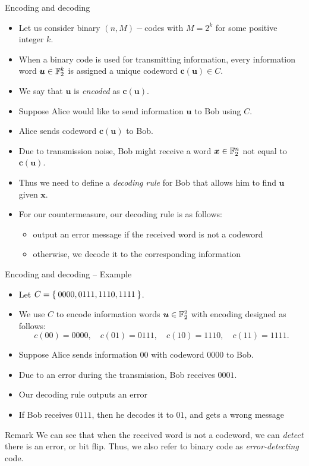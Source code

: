 \begin{frame}{Encoding and decoding}
    \begin{itemize}
        \item Let us consider binary $(n,M)-$codes with $M=2^k$ for some positive integer $k$.
       \item When a binary code is used for transmitting information, every information word $\boldsymbol{u}\in{\mathbb F}_2^k$ is assigned a unique codeword $\boldsymbol{c}(\boldsymbol{u})\in C$.
       \item We say that $\boldsymbol{u}$ is \textit{encoded} as $\boldsymbol{c}(\boldsymbol{u})$.
       \item Suppose Alice would like to send information $\boldsymbol{u}$ to Bob using $C$.
       \item Alice sends codeword $\boldsymbol{c}(\boldsymbol{u})$ to Bob.
        \item Due to transmission noise, Bob might receive a word $\boldsymbol{x}\in{\mathbb F}_2^n$ not equal to $\boldsymbol{c}(\boldsymbol{u})$.
       \item Thus we need to define a \textit{decoding rule} for Bob that allows him to find $\boldsymbol{u}$ given $\boldsymbol{x}$.
       \item For our countermeasure, our decoding rule is as follows:
       \begin{itemize}
           \item output an error message if the received word is not a codeword
           \item otherwise, we decode it to the corresponding information
       \end{itemize}
    \end{itemize}
\end{frame}

\begin{frame}{Encoding and decoding -- Example}
    \begin{example}
    \begin{itemize}
        \item Let $C=\Set{0000,0111, 1110, 1111}$.
         \item We use $C$ to encode information words $\boldsymbol{u}\in{\mathbb F}_2^2$ with encoding designed as follows:
\[
c(00)=0000,\quad c(01)=0111,\quad c(10)=1110,\quad c(11)=1111.
\]
\item Suppose Alice sends information $00$ with codeword $0000$ to Bob.
\item Due to an error during the transmission, Bob receives $0001$.
\item Our decoding rule outputs an error
\item If Bob receives $0111$, then he decodes it to $01$, and gets a wrong message
    \end{itemize}
\end{example}
\begin{alertblock}{Remark}
    We can see that when the received word is not a codeword, we can \textit{detect} there is an error, or bit flip.
    Thus, we also refer to binary code as \textit{error-detecting} code.
\end{alertblock}
\end{frame}



